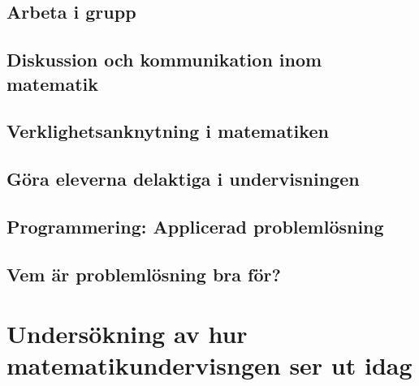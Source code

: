 \documentclass[11pt,a4paper]{article}
\begin{document}
    \subsection{Arbeta i grupp}
        
        
    \subsection{Diskussion och kommunikation inom matematik}
        
        \label{sec:Diskussion}
        
    \subsection{Verklighetsanknytning i matematiken}
        \label{sec:Verklighetsanknytning}
        
        
    \subsection{Göra eleverna delaktiga i undervisningen}
        
        \label{sec:delaktighet}
        
    \subsection{Programmering: Applicerad problemlösning}
        \label{sec:ProgrammeringOchMatematik}
        
        
    \subsection{Vem är problemlösning bra för?}
        
    
\section{Undersökning av hur matematikundervisngen ser ut idag}
    
    
\end{document}
